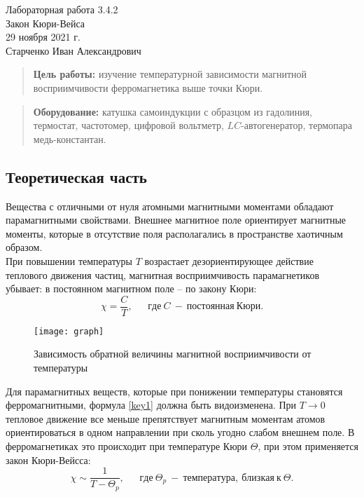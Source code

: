 \documentclass{lab}
\begin{document}
\begin{center}
  \LARGE{Лабораторная работа 3.4.2}\\[0.2cm]
  \LARGE{Закон Кюри-Вейса}\\[0.2cm]
  \large{29 ноября 2021 г.}\\[0.2cm]
  \large{Старченко Иван Александрович}\\[0.2cm]
\end{center}

\begin{quote}
\textbf{{\normalsize Цель работы: }}
изучение температурной зависимости магнитной восприимчивости ферромагнетика выше точки Кюри.
\end{quote}

\begin{quote}
\textbf{{\normalsize Оборудование: }}
катушка самоиндукции с образцом из гадолиния, термостат, частотомер, цифровой вольтметр,
$ LC $-автогенератор, термопара медь-константан.
\end{quote}

\subsection*{Теоретическая часть}
\hspace*{\parindent}
Вещества с отличными от нуля атомными магнитными моментами обладают парамагнитными свойствами.
Внешнее магнитное поле ориентирует магнитные моменты, которые в отсутствие поля располагались
в пространстве хаотичным образом.\\
При повышении температуры $ T $ возрастает дезориентирующее действие теплового движения частиц,
магнитная восприимчивость парамагнетиков убывает: в постоянном магнитном поле -- по закону Кюри:
\begin{equation}\label{key1}
\chi = \dfrac{C}{T}, ~~~~~~~ где ~ C ~ - ~ постоянная ~ Кюри.
\end{equation}
\begin{wrapfigure}[12]{r}{3.5cm}
	\vspace{-0.7cm}
	\texttt{[image: graph]}
	\caption{\footnotesize
	Зависимость обратной величины магнитной восприимчивости от температуры
	}
	\label{graph}
\end{wrapfigure}
\hspace*{\parindent}
Для парамагнитных веществ, которые при понижении температуры становятся ферромагнитными, формула
\eqref{key1} должна быть видоизменена. При $ T \rightarrow 0 $ тепловое движение все меньше
препятствует магнитным моментам атомов ориентироваться в одном направлении при сколь угодно
слабом внешнем поле. В ферромагнетиках это происходит при температуре Кюри $ \Theta $, при этом
применяется закон Кюри-Вейсса:
\begin{equation}\label{key2}
\chi \sim \dfrac{1}{T - \Theta_p}, ~~~~~~~ где ~ \Theta_p ~ - ~ температура, ~ близкая ~ к
~ \Theta.
\end{equation}
\end{document}
